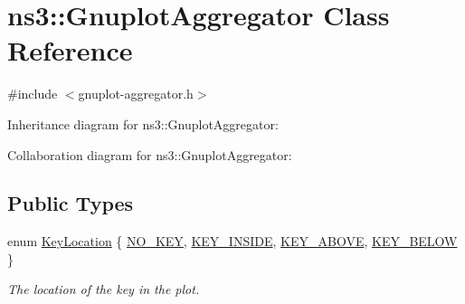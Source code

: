 \hypertarget{classns3_1_1GnuplotAggregator}{}\section{ns3\+:\+:Gnuplot\+Aggregator Class Reference}
\label{classns3_1_1GnuplotAggregator}


{\ttfamily \#include $<$gnuplot-\/aggregator.\+h$>$}



Inheritance diagram for ns3\+:\+:Gnuplot\+Aggregator\+:


Collaboration diagram for ns3\+:\+:Gnuplot\+Aggregator\+:
\subsection*{Public Types}
\begin{DoxyCompactItemize}
\item 
enum \hyperlink{classns3_1_1GnuplotAggregator_a84f2dafa52bb704042bc13c6cd6ee216}{Key\+Location} \{ \hyperlink{classns3_1_1GnuplotAggregator_a84f2dafa52bb704042bc13c6cd6ee216af5a6e02f9f83010af061d4b698083f09}{N\+O\+\_\+\+K\+EY}, 
\hyperlink{classns3_1_1GnuplotAggregator_a84f2dafa52bb704042bc13c6cd6ee216a000db4d25c0c0a52bfc23225ad6ab0bb}{K\+E\+Y\+\_\+\+I\+N\+S\+I\+DE}, 
\hyperlink{classns3_1_1GnuplotAggregator_a84f2dafa52bb704042bc13c6cd6ee216ad372020707693e9f2f4e28a38359de84}{K\+E\+Y\+\_\+\+A\+B\+O\+VE}, 
\hyperlink{classns3_1_1GnuplotAggregator_a84f2dafa52bb704042bc13c6cd6ee216ac1953382120be26da341c79c4bb40898}{K\+E\+Y\+\_\+\+B\+E\+L\+OW}
 \}\begin{DoxyCompactList}\small\item\em The location of the key in the plot. \end{DoxyCompactList}
\end{DoxyCompactItemize}
